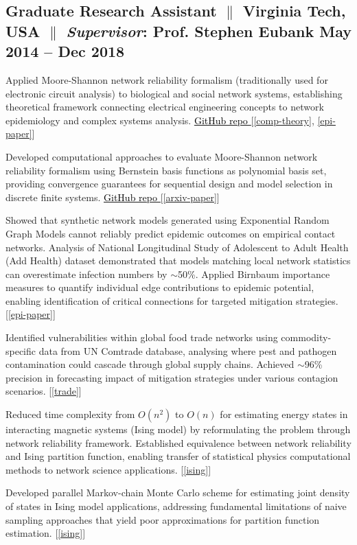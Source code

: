 \subsection{Graduate Research Assistant $\|$ Virginia Tech, USA $\|$ {\textit{Supervisor}}: Prof. Stephen Eubank \hfill May 2014 -- Dec 2018}
\begin{zitemize}
\item Applied Moore-Shannon network reliability formalism (traditionally used for electronic circuit analysis) to biological and social network systems, establishing theoretical framework connecting electrical engineering concepts to network epidemiology and complex systems analysis. {\href{https://github.com/NSSAC/reliability}{\underline{
\textcolor{black}{GitHub repo}
}}} [{\ref{comp-theory}, \ref{epi-paper}}]

\item Developed computational approaches to evaluate Moore-Shannon network reliability formalism using Bernstein basis functions as polynomial basis set, providing convergence guarantees for sequential design and model selection in discrete finite systems.
{\href{https://github.com/NSSAC/reliability}{\underline{
\textcolor{black}{GitHub repo}
}}} [{\ref{arxiv-paper}}]

\item Showed that synthetic network models generated using Exponential Random Graph Models cannot reliably predict epidemic outcomes on empirical contact networks. 
Analysis of National Longitudinal Study of Adolescent to Adult Health (Add Health) dataset demonstrated that models matching local network statistics can overestimate infection numbers by $\sim$50\%. Applied Birnbaum importance measures to quantify individual edge contributions to epidemic potential, enabling identification of critical connections for targeted mitigation strategies. [{\ref{epi-paper}}]

\item Identified vulnerabilities within global food trade networks using commodity-specific data from UN Comtrade database, analysing where pest and pathogen contamination could cascade through global supply chains. Achieved $\sim$96\% precision in forecasting impact of mitigation strategies under various contagion scenarios. [{\ref{trade}}]

\item Reduced time complexity from $O(n^2)$ to $O(n)$ for estimating energy states in interacting magnetic systems (Ising model) by reformulating the problem through network reliability framework. Established equivalence between network reliability and Ising partition function, enabling transfer of statistical physics computational methods to network science applications. [{\ref{ising}}]

\item  Developed parallel Markov-chain Monte Carlo scheme for estimating joint density of states in Ising model applications, addressing fundamental limitations of naive sampling approaches that yield poor approximations for partition function estimation. [{\ref{ising}}]
\end{zitemize}


